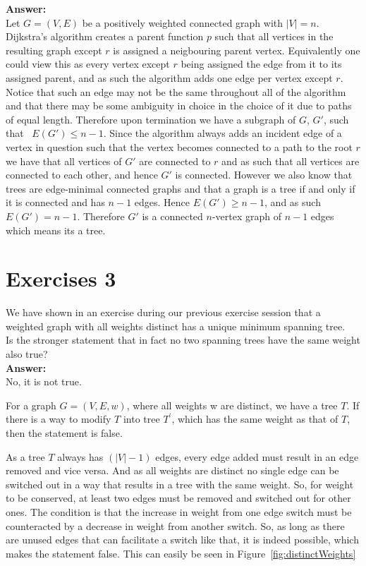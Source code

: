\documentclass[nobib]{tufte-handout}
\newcounter{counter}
\begin{document}
  \textbf{Answer:} \\ 
  Let $G = (V, E)$ be a positively weighted connected graph with $|V| = n$. Dijkstra's algorithm creates a parent function $p$ such that all vertices in the resulting graph except $r$ is assigned a neigbouring parent vertex. Equivalently one could view this as every vertex except $r$ being assigned the edge from it to its assigned parent, and as such the algorithm adds one edge per vertex except $r$. Notice that such an edge may not be the same throughout all of the algorithm and that there may be some ambiguity in choice in the choice of it due to paths of equal length. Therefore upon termination we have a subgraph of $G$, $G'$, such that \ $E(G') \leq n - 1$. Since the algorithm always adds an incident edge of a vertex in question such that the vertex becomes connected to a path to the root $r$ we have that all vertices of $G'$ are connected to $r$ and as such that all vertices are connected to each other, and hence $G'$ is connected. However we also know that trees are edge-minimal connected graphs and that a graph is a tree if and only if it is connected and has $n - 1$ edges. Hence $E(G') \geq n - 1$, and as such $E(G') = n - 1$. Therefore $G'$ is a connected $n$-vertex graph of $n - 1$ edges which means its a tree.
\newpage

\section{Exercises 3}
We have shown in an exercise during our previous exercise session that a weighted graph with all weights distinct has a unique minimum spanning tree. \\  

Is the stronger statement that in fact no two spanning trees have the same weight also true? \\

\textbf{Answer:} \\ 
No, it is not true.

For a graph $G = (V,E,w)$, where all weights w are distinct, we have a tree $T$. If there is a way to modify $T$ into tree $T^\prime$, which has the same weight as that of $T$, then the statement is false. 

As a tree $T$ always has $(|V|-1)$ edges, every edge added must result in an edge removed and vice versa. And as all weights are distinct no single edge can be switched out in a way that results in a tree with the same weight. So, for weight to be conserved, at least two edges must be removed and switched out for other ones. The condition is that the increase in weight from one edge switch must be counteracted by a decrease in weight from another switch. So, as long as there are unused edges that can facilitate a switch like that, it is indeed possible, which makes the statement false. This can easily be seen in Figure~\ref{fig:distinctWeights}
\end{document}
